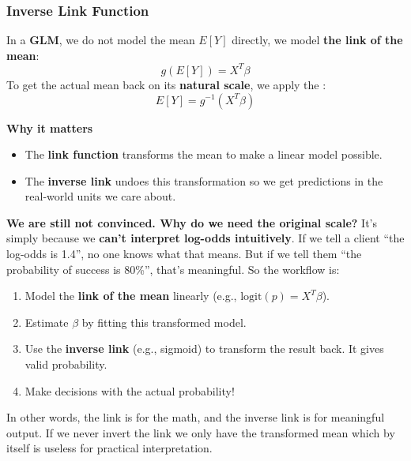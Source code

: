 \subsubsection{Inverse Link Function}\label{subsubsection: Inverse Link Function}

In a \textbf{GLM}, we do not model the mean $E[Y]$ directly, we model \textbf{the link of the mean}:
\begin{equation*}
    g(E[Y]) = X^T \beta
\end{equation*}
To get the actual mean back on its \textbf{natural scale}, we apply the :
\begin{equation}
    E[Y] = g^{-1}(X^T \beta)
\end{equation}

\highspace
\begin{flushleft}
    \textcolor{Green3}{ \textbf{Why it matters}}
\end{flushleft}
\begin{itemize}
    \item The \textbf{link function} transforms the mean to make a linear model possible.
    \item The \textbf{inverse link} undoes this transformation so we get predictions in the real-world units we care about.
\end{itemize}
\textcolor{Green3}{ \textbf{We are still not convinced. Why do we need the original scale?}} It's simply because we \textbf{can't interpret log-odds intuitively}. If we tell a client ``the log-odds is 1.4'', no one knows what that means. But if we tell them ``the probability of success is 80\%'', that's meaningful. So the workflow is:
\begin{enumerate}
    \item Model the \textbf{link of the mean} linearly (e.g., $\mathrm{logit}(p) = X^T \beta$).
    \item Estimate $\beta$ by fitting this transformed model.
    \item Use the \textbf{inverse link} (e.g., sigmoid) to transform the result back. It gives valid probability.
    \item Make decisions with the actual probability!
\end{enumerate}
In other words, the link is for the math, and the inverse link is for meaningful output. If we never invert the link we only have the transformed mean which by itself is useless for practical interpretation.

